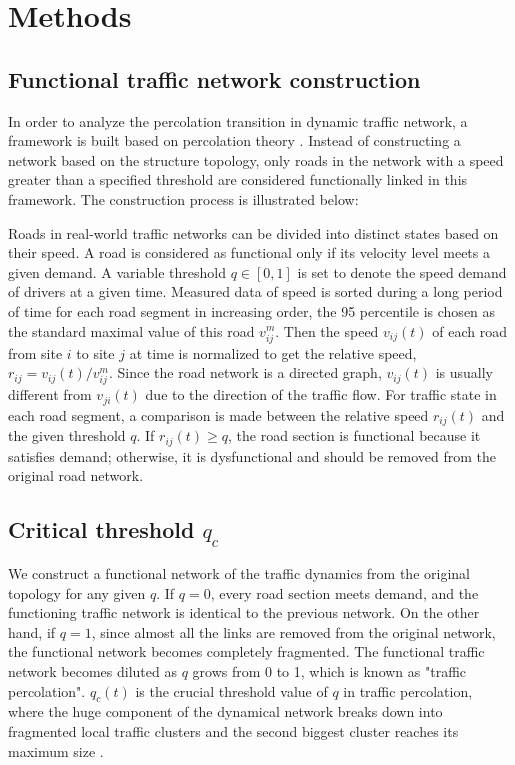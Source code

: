 \section{Methods} \label{sec: methods}

\subsection{Functional traffic network construction} \label{sec: network construction}
In order to analyze the percolation transition in dynamic traffic network, a framework is built based on percolation theory \cite{li2015percolation}. Instead of constructing a network based on the structure topology, only roads in the network with a speed greater than a specified threshold are considered functionally linked in this framework. The construction process is illustrated below:

Roads in real-world traffic networks can be divided into distinct states based on their speed. A road is considered as functional only if its velocity level meets a given demand. A variable threshold $ q \in [0, 1]$ is set to denote the speed demand of drivers at a given time. Measured data of speed is sorted during a long period of time for each road segment in increasing order, the 95 percentile is chosen as the standard maximal value of this road $v_{i j}^m$. Then the speed $v_{i j}(t)$ of each road from site $i$ to site $j$ at time is normalized to get the relative speed, $r_{i j} =v_{i j}(t)/v_{i j}^m$. Since the road network is a directed graph, $v_{i j}(t)$ is usually different from $v_{j i}(t)$ due to the direction of the traffic flow. For traffic state in each road segment, a comparison is made between the relative speed 
$r_{i j}(t)$ and the given threshold $q$. If $r_{i j}(t) \geq q$, the road section is functional because it satisfies demand; otherwise, it is dysfunctional and should be removed from the original road network.



\subsection{Critical threshold $q_c$}
We construct a functional network of the traffic dynamics from the original topology for any given $q$. If $q=0$, every road section meets demand, and the functioning traffic network is identical to the previous network. On the other hand, if $q=1$, since almost all the links are removed from the original network, the functional network becomes completely fragmented. The functional traffic network becomes diluted as $q$ grows from 0 to 1, which is known as "traffic percolation". $q_c(t)$ is the crucial threshold value of $q$ in traffic percolation, where the huge component of the dynamical network breaks down into fragmented local traffic clusters and the second biggest cluster reaches its maximum size \cite{li2015percolation, zeng2019switch}.


